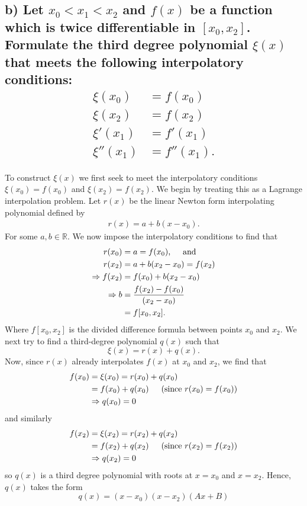 \documentclass[11pt, letterpaper]{article}
\begin{document}
\subsection*{b) \normalfont Let $x_0<x_1<x_2$ and $f(x)$ be a function which is twice differentiable in $[x_0,x_2]$.
Formulate the third degree polynomial $\xi(x)$ that meets the following interpolatory conditions:
\begin{align*}
\xi(x_0)&=f(x_0)\\
\xi(x_2)&=f(x_2)\\
\xi'(x_1)&=f'(x_1)\\
\xi''(x_1)&=f''(x_1).
\end{align*}}
To construct $\xi(x)$ we first seek to meet the interpolatory conditions $\xi(x_0)=f(x_0)$ and $\xi(x_2)=f(x_2)$.
We begin by treating this as a Lagrange interpolation problem. Let $r(x)$ be the linear Newton form interpolating polynomial defined by
\begin{align*}
r(x)=a+b(x-x_0).
\end{align*}
For some $a,b\in\mathbb{R}$. We now impose the interpolatory conditions to find that
\begin{align*}
    r(x_0)&=a=f(x_0)\text{,\indent and}\\
    r(x_2)&=a+b(x_2-x_0)=f(x_2)\\
    \Rightarrow f(x_2)&=f(x_0)+b(x_2-x_0)\\
    \Rightarrow b&=\frac{f(x_2)-f(x_0)}{(x_2-x_0)}\\
    &=f[x_0,x_2].
\end{align*}
Where $f[x_0,x_2]$ is the divided difference formula between points $x_0$ and $x_2$. We next try to find
a third-degree polynomial $q(x)$ such that
\[\xi(x)=r(x)+q(x).\]
Now, since $r(x)$ already interpolates $f(x)$ at $x_0$ and $x_2$, we find that
\begin{align*}
    f(x_0)&=\xi(x_0)=r(x_0)+q(x_0)\\
    &=f(x_0)+q(x_0)\text{\indent (since $r(x_0)=f(x_0)$)}\\
    &\Rightarrow q(x_0)=0
\end{align*}
and similarly
\begin{align*}
    f(x_2)&=\xi(x_2)=r(x_2)+q(x_2)\\
    &=f(x_2)+q(x_2)\text{\indent (since $r(x_2)=f(x_2)$)}\\
    &\Rightarrow q(x_2)=0
\end{align*}
so $q(x)$ is a third degree polynomial with roots at $x=x_0$ and $x=x_2$. Hence, $q(x)$ takes the form
\[q(x)=(x-x_0)(x-x_2)(Ax+B)\]
\end{document}
